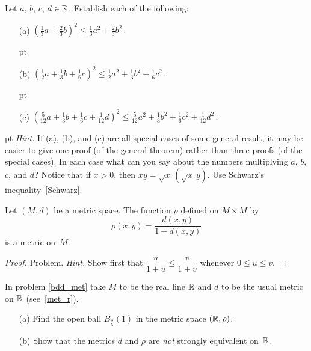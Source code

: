 \begin{prob} Let $a$, $b$, $c$, $d \in \mathbb{R}$.  Establish each of the following:
 \begin{enumerate}
  \item[(a)] $(\frac13a + \frac23b)^2 \le \frac13a^2 + \frac23b^2\,.$

 pt

  \item[(b)] $(\frac12a + \frac13b + \frac16c)^2
                    \le \frac12a^2 + \frac13b^2 + \frac16c^2\,.$

 pt

  \item[(c)] $(\frac5{12}a + \frac13b + \frac16c +\frac1{12}d)^2
                \le \frac5{12}a^2 + \frac13b^2 + \frac16c^2 + \frac1{12}d^2\,.$
 \end{enumerate}

 pt \noindent \emph{Hint.} If (a), (b), and (c) are all special cases of some general
result, it may be easier to give one proof (of the general theorem) rather than three proofs
(of the special cases). In each case what can you say about the numbers multiplying $a$, $b$,
$c$, and $d$? Notice that if $x > 0$, then $xy = \sqrt x\,(\sqrt x\,y)$. Use Schwarz's
inequality~\ref{Schwarz}.
\end{prob}

\begin{prop}\label{bdd_met} Let $(M,d)$ be a metric space. The function $\rho$ defined on
$M \times M$ by
  \[ \rho(x,y) = \frac{d(x,y)}{1 + d(x,y)} \]
is a metric on~$M$.
\end{prop}

\begin{proof} Problem. \emph{Hint.}  Show first that  $\dfrac u{1+u} \le \dfrac v{1+v}$
whenever $0 \le u \le v$.  \ns
\end{proof}

\begin{prob}\label{d_ne_rho} In problem \ref{bdd_met} take $M$ to be the real line $\mathbb{R}$ and
$d$ to be the usual metric on $\mathbb{R}$ (see~\ref{met_r}).
 \begin{enumerate}
  \item[(a)] Find the open ball $B_{\frac35}(1)$ in the metric space $(\mathbb{R}, \rho)$.
  \item[(b)] Show that the metrics $d$ and $\rho$ are \emph{not} strongly equivalent on~$\mathbb{R}$.
 \end{enumerate}
\end{prob}



\endinput
